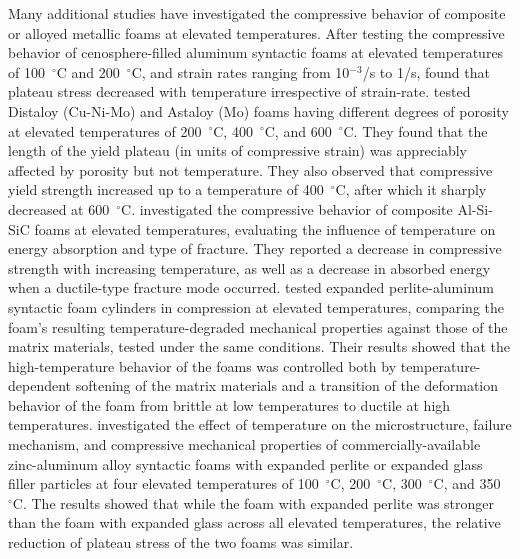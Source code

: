 \documentclass[review]{elsarticle}
\begin{document}
Many additional studies have investigated the compressive behavior of composite or alloyed metallic foams at elevated temperatures. After testing the compressive behavior of cenosphere-filled aluminum syntactic foams at elevated temperatures of 100~$^{\circ}\mathrm{C}$ and 200~$^{\circ}\mathrm{C}$, and strain rates ranging from 10$^{-3}$/s to 1/s, \cite{Mondal:2012} found that plateau stress decreased with temperature irrespective of strain-rate. \cite{Bekoz:2014} tested Distaloy (Cu-Ni-Mo) and Astaloy (Mo) foams having different degrees of porosity at elevated temperatures of 200~$^{\circ}\mathrm{C}$, 400~$^{\circ}\mathrm{C}$, and 600~$^{\circ}\mathrm{C}$. They found that the length of the yield plateau (in units of compressive strain) was appreciably affected by porosity but not temperature. They also observed that compressive yield strength increased up to a temperature of 400~$^{\circ}\mathrm{C}$, after which it sharply decreased at 600~$^{\circ}\mathrm{C}$. \cite{Liuetal2016} investigated the compressive behavior of composite Al-Si-SiC foams at elevated temperatures, evaluating the influence of temperature on energy absorption and type of fracture. They reported a decrease in compressive strength with increasing temperature, as well as a decrease in absorbed energy when a ductile-type fracture mode occurred. \cite{Taherishargh2018} tested expanded perlite-aluminum syntactic foam cylinders in compression at elevated temperatures, comparing the foam's resulting temperature-degraded mechanical properties against those of the matrix materials, tested under the same conditions. Their results showed that the high-temperature behavior of the foams was controlled both by temperature-dependent softening of the matrix materials and a transition of the deformation behavior of the foam from brittle at low temperatures to ductile at high temperatures. \cite{Linul:2019} investigated the effect of temperature on the microstructure, failure mechanism, and compressive mechanical properties of commercially-available zinc-aluminum alloy syntactic foams with expanded perlite or expanded glass filler particles at four elevated temperatures of 100~$^{\circ}\mathrm{C}$, 200~$^{\circ}\mathrm{C}$, 300~$^{\circ}\mathrm{C}$, and 350~$^{\circ}\mathrm{C}$. The results showed that while the foam with expanded perlite was stronger than the foam with expanded glass across all elevated temperatures, the relative reduction of plateau stress of the two foams was similar.
\end{document}
